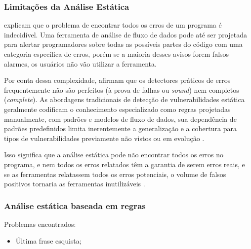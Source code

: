 \documentclass[
    12pt,                %
    openright,           %
    oneside,             %
    a4paper,             %
    english,             %
    brazil               %
]{abntex2}
\begin{document}
\begin{itemize}
\subsubsection{Limitações da Análise Estática}
\label{sec:limitacoesanalise}
\par
{} explicam que o problema de encontrar todos os erros de um programa é indecidível.
Uma ferramenta de análise de fluxo de dados pode até ser projetada para alertar programadores sobre todas as possíveis partes do código com uma categoria específica de erros, porém se a maioria desses avisos forem falsos alarmes, os usuários não vão utilizar a ferramenta.
\par
Por conta dessa complexidade,  afirmam que os detectores práticos de erros frequentemente não são perfeitos (à prova de falhas ou \textit{sound}) nem completos (\textit{complete}).
As abordagens tradicionais de detecção de vulnerabilidades estática geralmente codificam o conhecimento especializado como regras projetadas manualmente, com padrões e modelos de fluxo de dados, sua dependência de padrões predefinidos limita inerentemente a generalização e a cobertura para tipos de vulnerabilidades previamente não vistos ou em evolução \cite{li2026llmbased}.
\par
Isso significa que a análise estática pode não encontrar todos os erros no programa, e nem todos os erros relatados têm a garantia de serem erros reais, e se as ferramentas relatassem todos os erros potenciais, o volume de falsos positivos tornaria as ferramentas inutilizáveis \cite{aho2007compilers}.

\subsubsection{Análise estática baseada em regras}
\label{sec:analiseestaticaregras}

\par
Problemas encontrados:

\begin{itemize}
  \item Última frase esquista;
\end{itemize}


\end{itemize}
\end{document}
